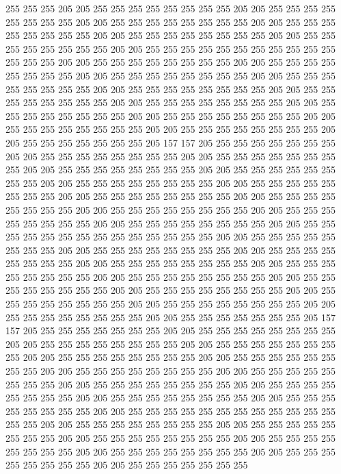 255 255 255 205 205 255 255 255 255 255 255 255 255 205 205 255 255 255 255 255
255 255 255 205 205 255 255 255 255 255 255 255 255 205 205 255 255 255 255 255
255 255 255 205 205 255 255 255 255 255 255 255 255 205 205 255 255 255 255 255
255 255 255 205 205 255 255 255 255 255 255 255 255 255 255 255 255 255 255 205
205 255 255 255 255 255 255 255 255 205 205 255 255 255 255 255 255 255 255 205
205 255 255 255 255 255 255 255 255 205 205 255 255 255 255 255 255 255 255 205
205 255 255 255 255 255 255 255 255 205 205 255 255 255 255 255 255 255 255 205
205 255 255 255 255 255 255 255 255 205 205 255 255 255 255 255 255 255 255 205
205 255 255 255 255 255 255 255 255 205 205 255 255 255 255 255 255 255 255 205
205 255 255 255 255 255 255 255 255 205 205 255 255 255 255 255 255 255 205 157
157 205 255 255 255 255 255 255 255 205 205 255 255 255 255 255 255 255 255 205
205 255 255 255 255 255 255 255 255 205 205 255 255 255 255 255 255 255 255 205
205 255 255 255 255 255 255 255 255 205 205 255 255 255 255 255 255 255 255 205
205 255 255 255 255 255 255 255 255 205 205 255 255 255 255 255 255 255 255 205
205 255 255 255 255 255 255 255 255 205 205 255 255 255 255 255 255 255 255 205
205 255 255 255 255 255 255 255 255 205 205 255 255 255 255 255 255 255 255 205
205 255 255 255 255 255 255 255 255 255 255 255 255 255 255 205 205 255 255 255
255 255 255 255 255 205 205 255 255 255 255 255 255 255 255 205 205 255 255 255
255 255 255 255 255 205 205 255 255 255 255 255 255 255 255 205 205 255 255 255
255 255 255 255 255 205 205 255 255 255 255 255 255 255 255 205 205 255 255 255
255 255 255 255 255 205 205 255 255 255 255 255 255 255 255 205 205 255 255 255
255 255 255 255 255 205 205 255 255 255 255 255 255 255 255 205 205 255 255 255
255 255 255 255 255 205 205 255 255 255 255 255 255 255 205 157 157 205 255 255
255 255 255 255 255 205 205 255 255 255 255 255 255 255 255 205 205 255 255 255
255 255 255 255 255 205 205 255 255 255 255 255 255 255 255 205 205 255 255 255
255 255 255 255 255 205 205 255 255 255 255 255 255 255 255 205 205 255 255 255
255 255 255 255 255 205 205 255 255 255 255 255 255 255 255 205 205 255 255 255
255 255 255 255 255 205 205 255 255 255 255 255 255 255 255 205 205 255 255 255
255 255 255 255 255 205 205 255 255 255 255 255 255 255 255 205 205 255 255 255
255 255 255 255 255 255 255 255 255 255 255 205 205 255 255 255 255 255 255 255
255 205 205 255 255 255 255 255 255 255 255 205 205 255 255 255 255 255 255 255
255 205 205 255 255 255 255 255 255 255 255 205 205 255 255 255 255 255 255 255
255 205 205 255 255 255 255 255 255 255 255 205 205 255 255 255 255 255 255 255
